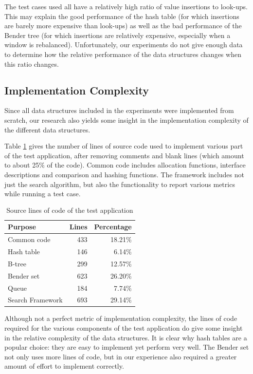 \documentclass{acm_proc_article-sp}
\begin{document}
The test cases used all have a relatively high ratio of value insertions to
look-ups. This may explain the good performance of the hash table (for
which insertions are barely more expensive than look-ups) as well as the bad
performance of the Bender tree (for which insertions are relatively expensive,
especially when a window is rebalanced). Unfortunately, our experiments do not
give enough data to determine how the relative performance of the data
structures changes when this ratio changes.

\subsection{Implementation Complexity}
Since all data structures included in the experiments were implemented from
scratch, our research also yields some insight in the implementation complexity
of the different data structures.

Table \ref {tab-loc} gives the number of lines of source code used to implement
various part of the test application, after removing comments and blank lines
(which amount to about 25\% of the code).
Common code includes allocation functions, interface descriptions and comparison
and hashing functions. The framework includes not just the search algorithm,
but also the functionality to report various metrics while running a test case.

\begin{table}[t]
\begin{center}
\begin{tabular}{ l r r }
\hline
\textbf{Purpose} & \textbf{Lines} & \textbf{Percentage} \\
\hline
Common code       & 433 & 18.21\% \\
Hash table        & 146 &  6.14\% \\
B-tree            & 299 & 12.57\% \\
Bender set        & 623 & 26.20\% \\
Queue             & 184 &  7.74\% \\
Search Framework  & 693 & 29.14\% \\
\hline
\end{tabular}
\caption{Source lines of code of the test application}
\label{tab-loc}
\end{center}
\end{table}

Although not a perfect metric of implementation complexity, the lines of code
required for the various components of the test application do give some
insight in the relative complexity of the data structures. It is clear why
hash tables are a popular choice: they are easy to implement yet perform very
well. The Bender set not only uses more lines of code, but in our experience
also required a greater amount of effort to implement correctly.
\end{document}
